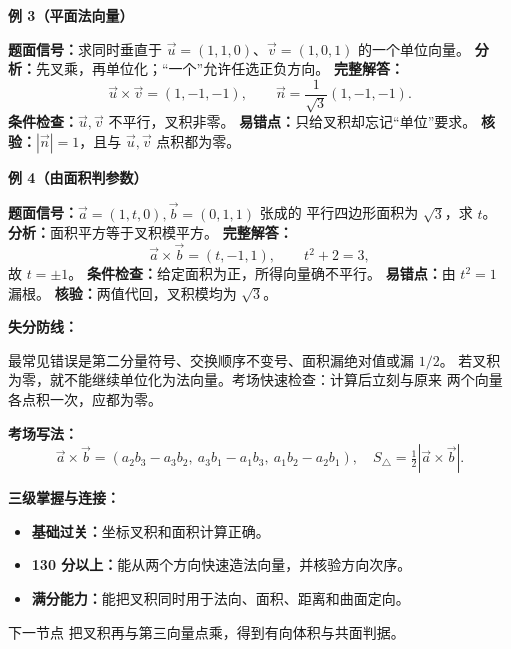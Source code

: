 \begin{knowledgeBox}
\textbf{例 3（平面法向量）}

\textbf{题面信号：}求同时垂直于
\(\vec u=(1,1,0)\)、\(\vec v=(1,0,1)\) 的一个单位向量。
\textbf{分析：}先叉乘，再单位化；“一个”允许任选正负方向。
\textbf{完整解答：}
\[
\vec u\times\vec v=(1,-1,-1),\qquad
\vec n=\frac1{\sqrt3}(1,-1,-1).
\]
\textbf{条件检查：}\(\vec u,\vec v\) 不平行，叉积非零。
\textbf{易错点：}只给叉积却忘记“单位”要求。
\textbf{核验：}\(|\vec n|=1\)，且与 \(\vec u,\vec v\) 点积都为零。

\textbf{例 4（由面积判参数）}

\textbf{题面信号：}\(\vec a=(1,t,0),\vec b=(0,1,1)\) 张成的
平行四边形面积为 \(\sqrt3\)，求 \(t\)。
\textbf{分析：}面积平方等于叉积模平方。
\textbf{完整解答：}
\[
\vec a\times\vec b=(t,-1,1),\qquad
t^2+2=3,
\]
故 \(t=\pm1\)。
\textbf{条件检查：}给定面积为正，所得向量确不平行。
\textbf{易错点：}由 \(t^2=1\) 漏根。
\textbf{核验：}两值代回，叉积模均为 \(\sqrt3\)。

\textbf{失分防线：}

最常见错误是第二分量符号、交换顺序不变号、面积漏绝对值或漏 \(1/2\)。
若叉积为零，就不能继续单位化为法向量。考场快速检查：计算后立刻与原来
两个向量各点积一次，应都为零。

\textbf{考场写法：}
\[
\boxed{\vec a\times\vec b
=(a_2b_3-a_3b_2,\ a_3b_1-a_1b_3,\ a_1b_2-a_2b_1),\quad
S_{\triangle}=\tfrac12|\vec a\times\vec b|.}
\]

\textbf{三级掌握与连接：}
\begin{itemize}
  \item \textbf{基础过关：}坐标叉积和面积计算正确。
  \item \textbf{130 分以上：}能从两个方向快速造法向量，并核验方向次序。
  \item \textbf{满分能力：}能把叉积同时用于法向、面积、距离和曲面定向。
\end{itemize}
下一节点 
把叉积再与第三向量点乘，得到有向体积与共面判据。
\end{knowledgeBox}


\par

